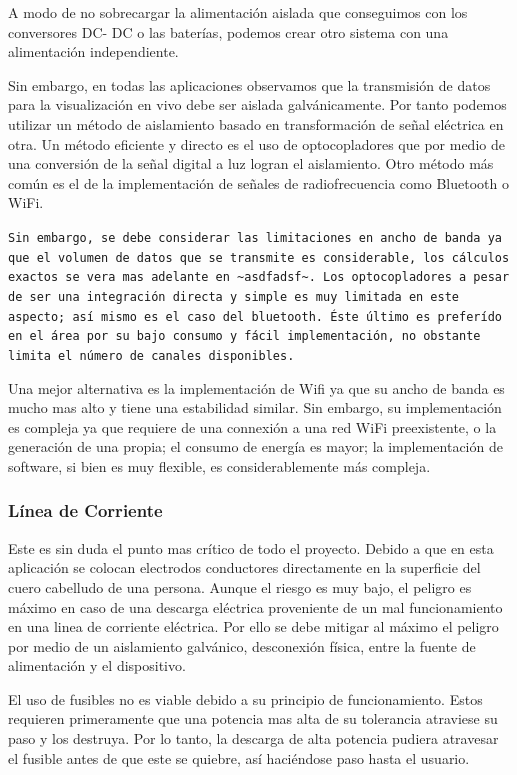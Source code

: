 A modo de no sobrecargar la alimentación aislada que conseguimos con los conversores DC- DC o las baterías, podemos crear otro sistema con una alimentación independiente.

Sin embargo, en todas las aplicaciones observamos que la transmisión de datos para la visualización en vivo debe ser aislada galvánicamente. Por tanto podemos utilizar un método de aislamiento basado en transformación de señal eléctrica en otra. Un método eficiente y directo es el uso de optocopladores que por medio de una conversión de la señal digital a luz logran el aislamiento. Otro método más común es el de la implementación de señales de radiofrecuencia como Bluetooth o WiFi.

\texttt{Sin embargo, se debe considerar las limitaciones en ancho de banda ya que el volumen de datos que se transmite es considerable, los cálculos exactos se vera mas adelante en \textasciitilde{}asdfadsf\textasciitilde{}. Los optocopladores a pesar de ser una integración directa y simple es muy limitada en este aspecto; así mismo es el caso del bluetooth. Éste último es preferído en el área por su bajo consumo y fácil implementación, no obstante limita el número de canales disponibles.}

Una mejor alternativa es la implementación de Wifi ya que su ancho de banda es mucho mas alto y tiene una estabilidad similar. Sin embargo, su implementación es compleja ya que requiere de una connexión a una red WiFi preexistente, o la generación de una propia; el consumo de energía es mayor; la implementación de software, si bien es muy flexible, es considerablemente más compleja.

\subsubsection{Línea de Corriente}
\label{sec:orgd08b729}
Este es sin duda el punto mas crítico de todo el proyecto. Debido a que en esta aplicación se colocan electrodos conductores directamente en la superficie del cuero cabelludo de una persona. Aunque el riesgo es muy bajo, el peligro es máximo en caso de una descarga eléctrica proveniente de un mal funcionamiento en una linea de corriente eléctrica. Por ello se debe mitigar al máximo el peligro por medio de un aislamiento galvánico, desconexión física, entre la fuente de alimentación y el dispositivo.

El uso de fusibles no es viable debido a su principio de funcionamiento. Estos requieren primeramente que una potencia mas alta de su tolerancia atraviese su paso y los destruya. Por lo tanto, la descarga de alta potencia pudiera atravesar el fusible antes de que este se quiebre, así haciéndose paso hasta el usuario.

